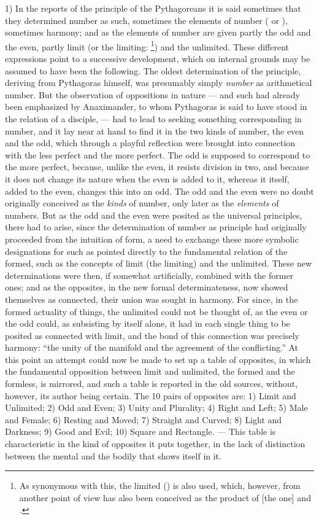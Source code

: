 1) In the reports of the principle of the Pythagoreans it is said
sometimes that they determined number as such, sometimes the elements
of number ( or ), sometimes harmony; and as the
elements of number are given partly the odd and the even, partly limit
(or the limiting: \footnote{As synonymous with this,
the limited () is also used, which, however, from
another point of view has also been conceived as the product of  [the one] and .}) and the unlimited. These different
expressions point to a successive development, which on internal
grounds may be assumed to have been the following. The oldest
determination of the principle, deriving from Pythagoras himself, was
presumably simply \emph{number} as arithmetical number. But the
observation of oppositions in nature --- and such had already been
emphasized by Anaximander, to whom Pythagoras is said to have stood in
the relation of a disciple, --- had to lead to seeking something
corresponding in number, and it lay near at hand to find it in the two
kinds of number, the even and the odd, which through a playful
reflection were brought into connection with the less perfect
and the more perfect. The odd is supposed to correspond to the more
perfect, because, unlike the even, it resists division in two, and
because it does not change its nature when the even is added to it,
whereas it itself, added to the even, changes this into an odd. The odd
and the even were no doubt originally conceived as the \emph{kinds} of
number, only later as the \emph{elements} of numbers. But as the odd
and the even were posited as the universal principles, there had to
arise, since the determination of number as principle had originally
proceeded from the intuition of form, a need to exchange these more
symbolic designations for such as pointed directly to the fundamental
relation of the formed, such as the concepts of limit (the limiting) and
the unlimited. These new determinations were then, if somewhat
artificially, combined with the former ones; and as the opposites, in
the new formal determinateness, now showed themselves as connected,
their union was sought in harmony. For since, in the formed actuality
of things, the unlimited could not be thought of, as the even or the
odd could, as subsisting by itself alone,
it had in each single thing to be posited as connected with limit, and
the bond of this connection was precisely harmony: ``the unity of the
manifold and the agreement of the conflicting.'' At this point an
attempt could now be made to set up a table of opposites, in which the
fundamental opposition between limit and unlimited, the formed and the
formless, is mirrored, and such a table is reported in the old sources,
without, however, its author being certain. The 10 pairs of opposites
are: 1) Limit and Unlimited; 2) Odd and Even; 3) Unity and Plurality;
4) Right and Left; 5) Male and Female; 6) Resting and Moved; 7) Straight
and Curved; 8) Light and Darkness; 9) Good and Evil; 10) Square and
Rectangle. --- This table is characteristic in the kind of opposites it
puts together, in the lack of distinction between the mental and the
bodily that shows itself in it.


